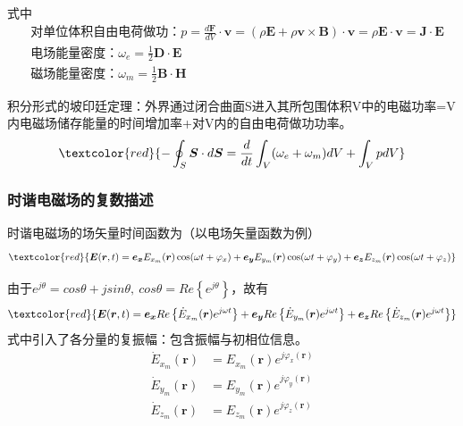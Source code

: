 \documentclass[withoutpreface,bwprint]{cumcmthesis} %
\begin{document}
式中
\begin{align}
    &\mbox{对单位体积自由电荷做功：}p = \frac{d\boldsymbol{F}}{dV}\cdot \boldsymbol{v} = (\rho \boldsymbol{E} + \rho \boldsymbol{v}\times \boldsymbol{B})\cdot \boldsymbol{v} = \rho \boldsymbol{E}\cdot \boldsymbol{v} = \boldsymbol{J}\cdot \boldsymbol{E}\\
    &\mbox{电场能量密度：}\omega_e = \frac{1}{2}\boldsymbol{D}\cdot \boldsymbol{E}\\
    &\mbox{磁场能量密度：}\omega_m = \frac{1}{2}\boldsymbol{B}\cdot \boldsymbol{H}
\end{align}

积分形式的坡印廷定理：外界通过闭合曲面S进入其所包围体积V中的电磁功率=V内电磁场储存能量的时间增加率+对V内的自由电荷做功功率。
\begin{align}
    \textcolor{red}{-\oint_S \boldsymbol{S}\cdot d\boldsymbol{S} = \frac{d}{dt}\int_V(\omega_e+\omega_m) dV + \int_V pdV}
\end{align}

\subsubsection{时谐电磁场的复数描述}
时谐电磁场的场矢量时间函数为（以电场矢量函数为例）
\begin{align}
    \textcolor{red}{
        \boldsymbol{E}(\boldsymbol{r}, t) = \boldsymbol{e_x}E_{x_m}(\boldsymbol{r})\cos(\omega t + \varphi_x) + \boldsymbol{e_y}E_{y_m}(\boldsymbol{r})\cos(\omega t + \varphi_y) + \boldsymbol{e_z}E_{z_m}(\boldsymbol{r})\cos(\omega t + \varphi_z)
        }
     \nonumber 
\end{align}

由于$e^{j\theta} = cos \theta + j sin\theta,\ cos \theta = Re\left\{e^{j\theta}\right\}$，故有
\begin{align}
    \textcolor{red}{
    \boldsymbol{E}(\boldsymbol{r}, t) = \boldsymbol{e_x} Re\left\{\dot{E}_{x_m}(\boldsymbol{r})e^{j\omega t}\right\} + \boldsymbol{e_y} Re\left\{\dot{E}_{y_m}(\boldsymbol{r})e^{j\omega t}\right\} + \boldsymbol{e_z} Re\left\{\dot{E}_{z_m}(\boldsymbol{r})e^{j\omega t}\right\}
    }
\end{align}
式中引入了各分量的复振幅：包含振幅与初相位信息。
\begin{align}
    \dot{E}_{x_m}(\boldsymbol{r}) &= E_{x_m}(\boldsymbol{r})e^{j\varphi_x(\boldsymbol{r})}\\
    \dot{E}_{y_m}(\boldsymbol{r}) &= E_{y_m}(\boldsymbol{r})e^{j\varphi_y(\boldsymbol{r})}\\
    \dot{E}_{z_m}(\boldsymbol{r}) &= E_{z_m}(\boldsymbol{r})e^{j\varphi_z(\boldsymbol{r})}
\end{align}
\end{document}
